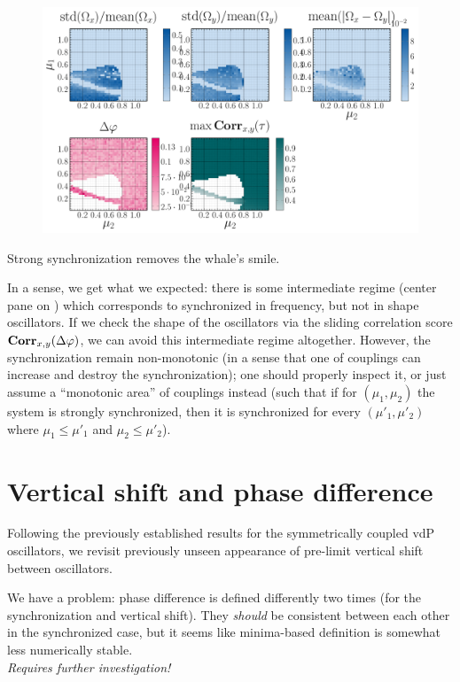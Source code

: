 \documentclass{mynotes}
\begin{document}
\begin{figure}[hbtp]
      \centering
      \includegraphics[width = 1.0\columnwidth]{figures/whale_new_06.pdf} 
      \label{fig:new_whale}
\end{figure}

\begin{remark}
      Strong synchronization removes the whale's smile.
\end{remark}

In a sense, we get what we expected: there is some intermediate regime (center pane on ) which corresponds to synchronized in frequency, but not in shape oscillators. If we check the shape of the oscillators via the sliding correlation score  \( \operatorname{\mathbf{Corr}}_{x,y}(\Delta \varphi )  \), we can avoid this intermediate regime altogether. However, the synchronization remain non-monotonic (in a sense that one of couplings can increase and destroy the synchronization); one should properly inspect it, or just assume a ``monotonic area'' of couplings instead (such that if for \( (\mu_1, \mu_2)\) the system is strongly synchronized, then it is synchronized for every   \( (\mu'_1, \mu'_2)\) where \( \mu_1 \le \mu'_1\) and \( \mu_2 \le \mu'_2 \)).


\section{ Vertical shift and phase difference }

Following the previously established results for the symmetrically coupled vdP oscillators, we revisit previously unseen appearance of pre-limit vertical shift between oscillators.

\begin{alert}[Inconsistency!]
      We have a problem: phase difference is defined differently two times (for the synchronization and vertical shift). They \textit{should} be consistent between each other in the synchronized case, but it seems like minima-based definition is somewhat less numerically stable. 
      \\[5pt]

      \textit{\color{rwth-red}Requires further investigation!}
\end{alert}
\end{document}
